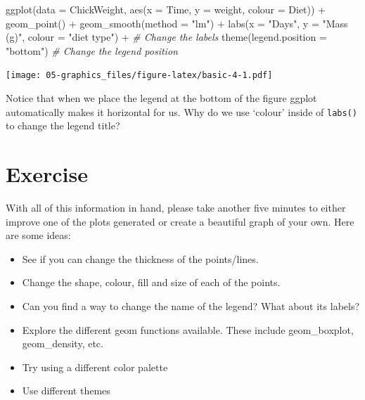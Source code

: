 \documentclass[
]{book}
\newenvironment{Shaded}{\begin{snugshade}}{\end{snugshade}}
\newcommand{\AttributeTok}[1]{\textcolor[rgb]{0.77,0.63,0.00}{#1}}
\newcommand{\CommentTok}[1]{\textcolor[rgb]{0.56,0.35,0.01}{\textit{#1}}}
\newcommand{\FunctionTok}[1]{\textcolor[rgb]{0.00,0.00,0.00}{#1}}
\newcommand{\NormalTok}[1]{#1}
\newcommand{\SpecialCharTok}[1]{\textcolor[rgb]{0.00,0.00,0.00}{#1}}
\newcommand{\StringTok}[1]{\textcolor[rgb]{0.31,0.60,0.02}{#1}}
\providecommand{\tightlist}{%
  \setlength{\itemsep}{0pt}\setlength{\parskip}{0pt}}
\begin{document}
\begin{Shaded}
\begin{Highlighting}[]
\FunctionTok{ggplot}\NormalTok{(}\AttributeTok{data =}\NormalTok{ ChickWeight, }\FunctionTok{aes}\NormalTok{(}\AttributeTok{x =}\NormalTok{ Time, }\AttributeTok{y =}\NormalTok{ weight, }\AttributeTok{colour =}\NormalTok{ Diet)) }\SpecialCharTok{+}
  \FunctionTok{geom\_point}\NormalTok{() }\SpecialCharTok{+}
  \FunctionTok{geom\_smooth}\NormalTok{(}\AttributeTok{method =} \StringTok{"lm"}\NormalTok{) }\SpecialCharTok{+}
  \FunctionTok{labs}\NormalTok{(}\AttributeTok{x =} \StringTok{"Days"}\NormalTok{, }\AttributeTok{y =} \StringTok{"Mass (g)"}\NormalTok{, }\AttributeTok{colour =} \StringTok{"diet type"}\NormalTok{) }\SpecialCharTok{+} \CommentTok{\# Change the labels}
  \FunctionTok{theme}\NormalTok{(}\AttributeTok{legend.position =} \StringTok{"bottom"}\NormalTok{) }\CommentTok{\# Change the legend position}
\end{Highlighting}
\end{Shaded}

\texttt{[image: 05-graphics\_files/figure-latex/basic-4-1.pdf]}

Notice that when we place the legend at the bottom of the figure ggplot automatically makes it horizontal for us. Why do we use `colour' inside of \texttt{labs()} to change the legend title?

\hypertarget{exercise-3}{%
\section{Exercise}\label{exercise-3}}

With all of this information in hand, please take another five minutes to either improve one of the plots generated or create a beautiful graph of your own. Here are some ideas:

\begin{itemize}
\tightlist
\item
  See if you can change the thickness of the points/lines.
\item
  Change the shape, colour, fill and size of each of the points.
\item
  Can you find a way to change the name of the legend? What about its labels?
\item
  Explore the different geom functions available. These include geom\_boxplot, geom\_density, etc.
\item
  Try using a different color palette
\item
  Use different themes
\end{itemize}
\end{document}
